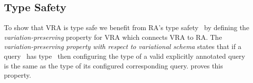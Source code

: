 \subsection{Type Safety}
\label{sec:var-pres}

To show that VRA is type safe we benefit from RA's type safety~\cite{RAtypeSys}
by defining the \emph{variation-preserving} property for VRA which connects VRA to RA.
%
The 
\emph{variation-preserving property with respect to variational schema} states that
if a query \vQ\ has type \vType\ then 
configuring the type of a valid explicitly annotated query
is the same as the type of its configured
corresponding query. 
%
 proves this property.

